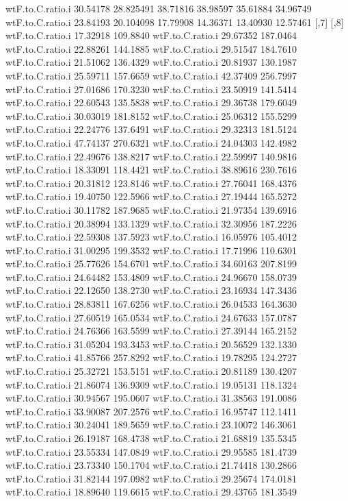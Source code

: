\documentclass[11pt]{article} %
\begin{document}
\begin{Schunk}
\begin{Soutput}
wtF.to.C.ratio.i  30.54178 28.825491 38.71816 38.98597 35.61884 34.96749
wtF.to.C.ratio.i  23.84193 20.104098 17.79908 14.36371 13.40930 12.57461
                     [,7]     [,8]
wtF.to.C.ratio.i 17.32918 109.8840
wtF.to.C.ratio.i 29.67352 187.0464
wtF.to.C.ratio.i 22.88261 144.1885
wtF.to.C.ratio.i 29.51547 184.7610
wtF.to.C.ratio.i 21.51062 136.4329
wtF.to.C.ratio.i 20.81937 130.1987
wtF.to.C.ratio.i 25.59711 157.6659
wtF.to.C.ratio.i 42.37409 256.7997
wtF.to.C.ratio.i 27.01686 170.3230
wtF.to.C.ratio.i 23.50919 141.5414
wtF.to.C.ratio.i 22.60543 135.5838
wtF.to.C.ratio.i 29.36738 179.6049
wtF.to.C.ratio.i 30.03019 181.8152
wtF.to.C.ratio.i 25.06312 155.5299
wtF.to.C.ratio.i 22.24776 137.6491
wtF.to.C.ratio.i 29.32313 181.5124
wtF.to.C.ratio.i 47.74137 270.6321
wtF.to.C.ratio.i 24.04303 142.4982
wtF.to.C.ratio.i 22.49676 138.8217
wtF.to.C.ratio.i 22.59997 140.9816
wtF.to.C.ratio.i 18.33091 118.4421
wtF.to.C.ratio.i 38.89616 230.7616
wtF.to.C.ratio.i 20.31812 123.8146
wtF.to.C.ratio.i 27.76041 168.4376
wtF.to.C.ratio.i 19.40750 122.5966
wtF.to.C.ratio.i 27.19444 165.5272
wtF.to.C.ratio.i 30.11782 187.9685
wtF.to.C.ratio.i 21.97354 139.6916
wtF.to.C.ratio.i 20.38994 133.1329
wtF.to.C.ratio.i 32.30956 187.2226
wtF.to.C.ratio.i 22.59308 137.5923
wtF.to.C.ratio.i 16.05976 105.4012
wtF.to.C.ratio.i 31.00295 199.3532
wtF.to.C.ratio.i 17.71996 110.6301
wtF.to.C.ratio.i 25.77626 154.6701
wtF.to.C.ratio.i 34.60163 207.8199
wtF.to.C.ratio.i 24.64482 153.4809
wtF.to.C.ratio.i 24.96670 158.0739
wtF.to.C.ratio.i 22.12650 138.2730
wtF.to.C.ratio.i 23.16934 147.3436
wtF.to.C.ratio.i 28.83811 167.6256
wtF.to.C.ratio.i 26.04533 164.3630
wtF.to.C.ratio.i 27.60519 165.0534
wtF.to.C.ratio.i 24.67633 157.0787
wtF.to.C.ratio.i 24.76366 163.5599
wtF.to.C.ratio.i 27.39144 165.2152
wtF.to.C.ratio.i 31.05204 193.3453
wtF.to.C.ratio.i 20.56529 132.1330
wtF.to.C.ratio.i 41.85766 257.8292
wtF.to.C.ratio.i 19.78295 124.2727
wtF.to.C.ratio.i 25.32721 153.5151
wtF.to.C.ratio.i 20.81189 130.4207
wtF.to.C.ratio.i 21.86074 136.9309
wtF.to.C.ratio.i 19.05131 118.1324
wtF.to.C.ratio.i 30.94567 195.0607
wtF.to.C.ratio.i 31.38563 191.0086
wtF.to.C.ratio.i 33.90087 207.2576
wtF.to.C.ratio.i 16.95747 112.1411
wtF.to.C.ratio.i 30.24041 189.5659
wtF.to.C.ratio.i 23.10072 146.3061
wtF.to.C.ratio.i 26.19187 168.4738
wtF.to.C.ratio.i 21.68819 135.5345
wtF.to.C.ratio.i 23.55334 147.0849
wtF.to.C.ratio.i 29.95585 181.4739
wtF.to.C.ratio.i 23.73340 150.1704
wtF.to.C.ratio.i 21.74418 130.2866
wtF.to.C.ratio.i 31.82144 197.0982
wtF.to.C.ratio.i 29.25674 174.0181
wtF.to.C.ratio.i 18.89640 119.6615
wtF.to.C.ratio.i 29.43765 181.3549

\end{Soutput}
\end{Schunk}
\end{document}
